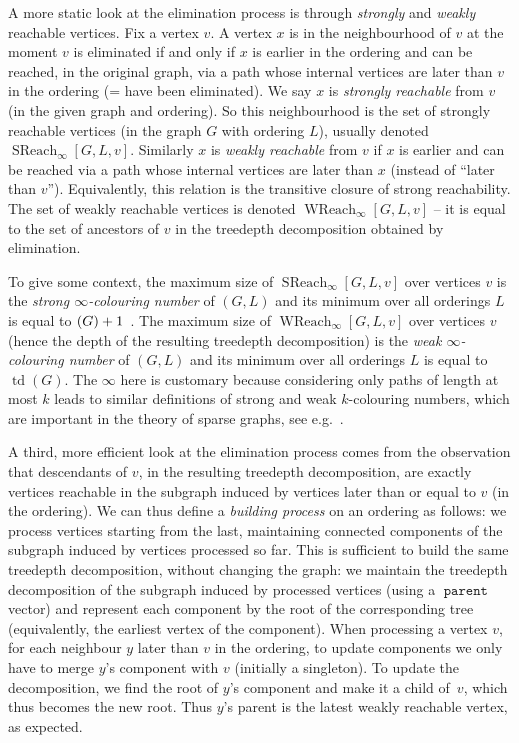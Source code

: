 \documentclass{timgad}
\DeclareMathOperator{\td}{td}
\let\tw\relax
\DeclareMathOperator{\tw}{tw}
\DeclareMathOperator{\SReach}{SReach}
\DeclareMathOperator{\WReach}{WReach}
\DeclareMathOperator{\parent}{\texttt{parent}}
\begin{document}
A more static look at the elimination process is through \emph{strongly} and \emph{weakly} reachable vertices.
Fix a vertex $v$.
A vertex $x$ is in the neighbourhood of $v$ at the moment $v$ is eliminated
if and only if $x$ is earlier in the ordering and can be reached, in the original graph, via a path whose internal vertices are later than $v$ in the ordering (= have been eliminated).
We say $x$ is \emph{strongly reachable} from $v$ (in the given graph and ordering).
So this neighbourhood is the set of strongly reachable vertices (in the graph $G$ with ordering $L$), usually denoted $\SReach_{\infty}[G,L,v]$.
Similarly $x$ is \emph{weakly reachable} from $v$ if $x$ is earlier and can be reached via a path whose internal vertices are later than $x$ (instead of ``later than $v$'').
Equivalently, this relation is the transitive closure of strong reachability.
The set of weakly reachable vertices is denoted $\WReach_{\infty}[G,L,v]$ -- it is equal to the set of ancestors of $v$ in the treedepth decomposition obtained by elimination.

To give some context,
the maximum size of $\SReach_{\infty}[G,L,v]$ over vertices $v$ is the \emph{strong $\infty$-colouring number} of $(G,L)$
and its minimum over all orderings $L$ is equal to $\tw(G) + 1$~\cite[Theorem 3.1]{Arnborg85}.
The maximum size of $\WReach_{\infty}[G,L,v]$ over vertices $v$ (hence the depth of the resulting treedepth decomposition) is the \emph{weak $\infty$-colouring number} of $(G,L)$
and its minimum over all orderings $L$ is equal to $\td(G)$.
The $\infty$ here is customary because considering only paths of length at most $k$ leads to similar definitions of strong and weak $k$-colouring numbers, which are important in the theory of sparse graphs, see e.g.~\cite{HeuvelMQRS17}.

A third, more efficient look at the elimination process comes from the observation that 
descendants of $v$, in the resulting treedepth decomposition, are exactly vertices reachable in the subgraph induced by vertices later than or equal to $v$ (in the ordering).
We can thus define a \emph{building process} on an ordering as follows:
we process vertices starting from the last, maintaining connected components of the subgraph induced by vertices processed so far.
This is sufficient to build the same treedepth decomposition, without changing the graph:
we maintain the treedepth decomposition of the subgraph induced by processed vertices
(using a $\parent$ vector)
and represent each component by the root of the corresponding tree (equivalently, the earliest vertex of the component).
When processing a vertex $v$, 
for each neighbour $y$ later than $v$ in the ordering, to update components we only have to
merge $y$'s component with $v$ (initially a singleton).
To update the decomposition,
we find the root of $y$'s component and make it a child of~$v$,
which thus becomes the new root.
Thus $y$'s parent is the latest weakly reachable vertex, as expected.
\end{document}
